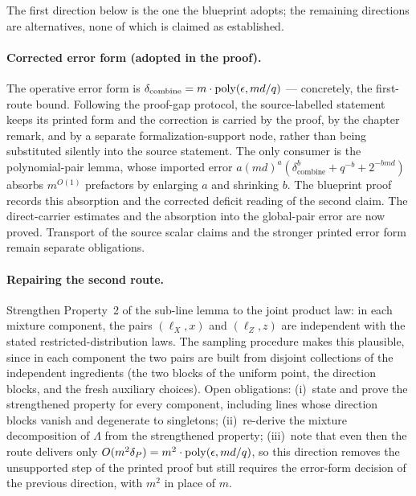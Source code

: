 \documentclass[11pt]{article}
\DeclareMathOperator{\poly}{poly}
\begin{document}
The first direction below is the one the blueprint adopts; the remaining
directions are alternatives, none of which is claimed as established.

\paragraph{Corrected error form (adopted in the proof).}
The operative error form is
$\delta_{\mathrm{combine}} = m \cdot \poly(\eps, md/q)$ --- concretely,
the first-route bound.  Following the proof-gap protocol, the source-labelled
statement keeps its printed form and the correction is carried by the proof,
by the chapter remark, and by a separate formalization-support node, rather
than being substituted silently into the source statement.  The only consumer
is the polynomial-pair lemma, whose imported error
$a(md)^a(\delta_{\mathrm{combine}}^b + q^{-b} + 2^{-bmd})$ absorbs
$m^{O(1)}$ prefactors by enlarging $a$ and shrinking $b$.  The blueprint proof
records this absorption and the corrected deficit reading of the second claim.
The direct-carrier estimates and the absorption into the global-pair error
are now proved. Transport of the source scalar claims and the stronger
printed error form remain separate obligations.

\paragraph{Repairing the second route.}
Strengthen Property~2 of the sub-line lemma to the joint product law: in
each mixture component, the pairs $(\ell_X, x)$ and $(\ell_Z, z)$ are
independent with the stated restricted-distribution laws.  The sampling
procedure makes this plausible, since in each component the two pairs
are built from disjoint collections of the independent ingredients (the
two blocks of the uniform point, the direction blocks, and the fresh
auxiliary choices).  Open obligations: (i)~state and prove the
strengthened property for every component, including lines whose
direction blocks vanish and degenerate to singletons; (ii)~re-derive the
mixture decomposition of $\Lambda$ from the strengthened property;
(iii)~note that even then the route delivers only
$O(m^2\delta_P) = m^2 \cdot \poly(\eps, md/q)$, so this direction removes
the unsupported step of the printed proof but still requires the
error-form decision of the previous direction, with $m^2$ in place of
$m$.
\end{document}
